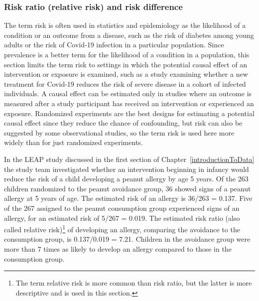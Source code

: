 \subsubsection{Risk ratio (relative risk) and risk difference}

The term risk is often used in statistics and epidemiology as the likelihood of a condition or an outcome from a disease, such as the risk of diabetes among young adults or the risk of Covid-19 infection in a particular population. Since prevalence is a better term for the likelihood of a condition in a population,  this section limits the term risk to settings in which the potential causal effect of an intervention or exposure is examined, such as a study examining whether a new treatment for Covid-19 reduces the risk of severe disease in a cohort of infected individuals. A causal effect can be estimated only in studies where an outcome is measured after a study participant has received an intervention or experienced an exposure. Randomized experiments are the best designs for estimating a potential causal effect since they reduce the chance of confounding, but risk can also be suggested by some observational studies, so the term risk is used here more widely than for just randomized experiments.

 In the LEAP study discussed in the first section of Chapter~\ref{introductionToData} the study team investigated whether an intervention beginning in infancy would reduce the risk  of a child developing a peanut allergy by age 5 years. Of the 263 children randomized to the peanut avoidance group, 36 showed signs of a peanut allergy at 5 years of age.  The estimated risk of an allergy is 36/263 = 0.137.  Five of the 267 assigned to the peanut consumption group experienced signs of an allergy, for an estimated risk of 5/267 = 0.019. The estimated risk ratio (also called relative risk)\footnote{The term relative risk is more common than risk ratio, but the latter is more descriptive and is used in this section.} of developing an allergy, comparing the avoidance to the consumption group, is 0.137/0.019 = 7.21.  Children in the avoidance group were more than 7 times as likely to develop an allergy compared to those in the consumption group.

